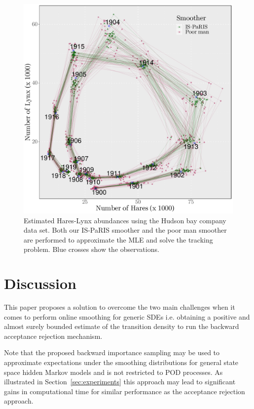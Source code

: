 \documentclass{article}
\begin{document}
\begin{figure}
\begin{center}
\includegraphics[scale = 0.4]{smoothing_hares_lynx.pdf}
\end{center}
\caption{\label{fig:LV:hares:lynx} Estimated Hares-Lynx abundances using the Hudson bay company data set. Both our IS-PaRIS smoother and the poor man smoother are performed to approximate the MLE and solve the tracking problem. Blue crosses show the observations.}
\end{figure}

\section{Discussion}
\label{sec:discussion} 
This paper proposes a solution to overcome the two main challenges when it comes to  perform online smoothing for generic SDEs i.e. obtaining a positive and almost surely bounded estimate of the transition density to run the  backward acceptance rejection mechanism. 

Note that the proposed backward importance sampling may be used to approximate expectations under the smoothing distributions for general state space hidden Markov models and  is not restricted to POD processes. As illustrated in Section~\ref{sec:experiments} this approach may lead to significant  gains in computational time for similar performance as the acceptance rejection approach. 
\end{document}
